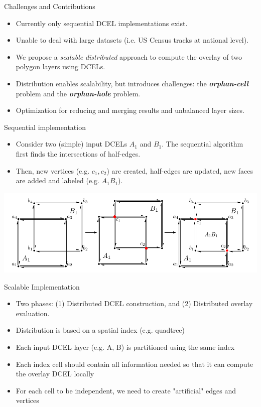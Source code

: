     \begin{frame}{Challenges and Contributions}
        \begin{itemize}
            \item Currently only sequential DCEL implementations exist.
            \item Unable to deal with large datasets (i.e. US Census tracks at national level).
            \item We propose a \textit{scalable} \textit{distributed} approach to compute the overlay of two polygon layers using DCELs.
            \item Distribution enables scalability, but introduces challenges: the \textbf{\textit{orphan-cell}} problem and the \textbf{\textit{orphan-hole}} problem.
            \item Optimization for reducing and merging results and unbalanced layer sizes.
        \end{itemize}

    \end{frame}

    \begin{frame}{Sequential implementation}
        \begin{itemize}
                \item Consider two (simple) input DCELs $A_1$ and $B_1$.  The sequential algorithm first finds the intersections of half-edges.
                \item Then, new vertices (e.g. $c_1, c_2$) are created,  half-edges are updated, new faces are added and labeled (e.g. $A_1B_1$).
        \end{itemize}

        \centering
        \includegraphics[width=\textwidth]{../thesis/chapterSDCEL/dcel2}
    \end{frame}

    \begin{frame}{Scalable Implementation}
        \begin{itemize}
            \small
            \item Two phases: (1) Distributed DCEL construction, and (2) Distributed overlay evaluation.
            \item Distribution is based on a spatial index (e.g. quadtree)
            \item Each input DCEL layer (e.g. A, B) is partitioned using the same index
            \item Each index cell should contain all information needed so that it can compute the overlay DCEL locally
            \item For each cell to be independent, we need to create "artificial" edges and vertices
        \end{itemize}
    \end{frame}

